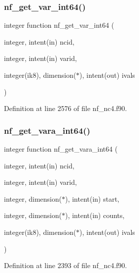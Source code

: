\subsubsection{\texorpdfstring{nf\+\_\+get\+\_\+var\+\_\+int64()}{nf\_get\_var\_int64()}}
{\footnotesize\ttfamily integer function nf\+\_\+get\+\_\+var\+\_\+int64 (\begin{DoxyParamCaption}\item[{integer, intent(in)}]{ncid,  }\item[{integer, intent(in)}]{varid,  }\item[{integer(ik8), dimension($\ast$), intent(out)}]{ivals }\end{DoxyParamCaption})}



Definition at line 2576 of file nf\+\_\+nc4.\+f90.

\mbox{\label{nf__nc4_8f90_af163b0841f102fc244434763449227a8}} 
\subsubsection{\texorpdfstring{nf\+\_\+get\+\_\+vara\+\_\+int64()}{nf\_get\_vara\_int64()}}
{\footnotesize\ttfamily integer function nf\+\_\+get\+\_\+vara\+\_\+int64 (\begin{DoxyParamCaption}\item[{integer, intent(in)}]{ncid,  }\item[{integer, intent(in)}]{varid,  }\item[{integer, dimension($\ast$), intent(in)}]{start,  }\item[{integer, dimension($\ast$), intent(in)}]{counts,  }\item[{integer(ik8), dimension($\ast$), intent(out)}]{ivals }\end{DoxyParamCaption})}



Definition at line 2393 of file nf\+\_\+nc4.\+f90.

\mbox{\label{nf__nc4_8f90_a588f7683a728fb377fdcd27b7af6c424}} 
